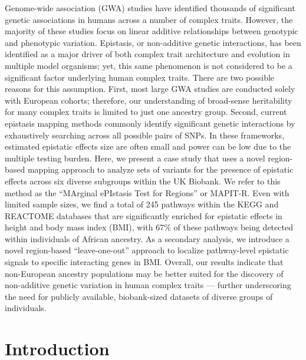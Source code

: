 \documentclass[10pt]{article}
\begin{document}
Genome-wide association (GWA) studies have identified thousands of significant genetic associations in humans across a number of complex traits. However, the majority of these studies focus on linear additive relationships between genotypic and phenotypic variation. Epistasis, or non-additive genetic interactions, has been identified as a major driver of both complex trait architecture and evolution in multiple model organisms; yet, this same phenomenon is not considered to be a significant factor underlying human complex traits. There are two possible reasons for this assumption. First, most large GWA studies are conducted solely with European cohorts; therefore, our understanding of broad-sense heritability for many complex traits is limited to just one ancestry group. Second, current epistasis mapping methods commonly identify significant genetic interactions by exhaustively searching across all possible pairs of SNPs. In these frameworks, estimated epistatic effects size are often small and power can be low due to the multiple testing burden. Here, we present a case study that uses a novel region-based mapping approach to analyze sets of variants for the presence of epistatic effects across six diverse subgroups within the UK Biobank. We refer to this method as the ``MArginal ePIstasis Test for Regions'' or MAPIT-R. Even with limited sample sizes, we find a total of 245 pathways within the KEGG and REACTOME databases that are significantly enriched for epistatic effects in height and body mass index (BMI), with 67\% of these pathways being detected within individuals of African ancestry. As a secondary analysis, we introduce a novel region-based ``leave-one-out'' approach to localize pathway-level epistatic signals to specific interacting genes in BMI. Overall, our results indicate that non-European ancestry populations may be better suited for the discovery of non-additive genetic variation in human complex traits --- further underscoring the need for publicly available, biobank-sized datasets of diverse groups of individuals.


\section*{Introduction}\label{MAPITR-Introduction}
\end{document}
